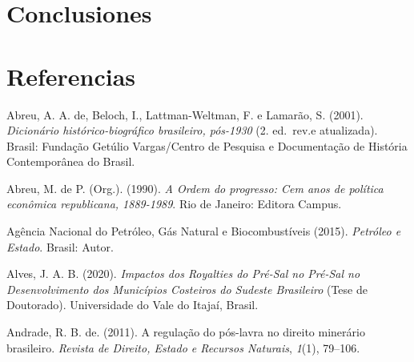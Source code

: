 \documentclass[12pt,letterpaper,oneside]{article}
\begin{document}
\section{Conclusiones}

\lipsum[1-2]

\section{Referencias}

\begin{hangparas}{6.2mm}{1}
	Abreu, A. A. de, Beloch, I., Lattman-Weltman, F. e Lamarão, S. (2001).	\emph{Dicionário histórico-biográfico brasileiro, pós-1930} (2. ed.~rev.e atualizada). Brasil: Fundação Getúlio Vargas/Centro de Pesquisa e	Documentação de História Contemporânea do Brasil.
	
	Abreu, M. de P. (Org.). (1990). \emph{A Ordem do progresso: Cem anos de	política econômica republicana, 1889-1989}. Rio de Janeiro: Editora Campus.
	
	Agência Nacional do Petróleo, Gás Natural e Biocombustíveis (2015).	\emph{Petróleo e Estado}. Brasil: Autor. 
	
	Alves, J. A. B. (2020). \emph{Impactos dos Royalties do Pré-Sal no Pré-Sal no Desenvolvimento dos Municípios Costeiros do Sudeste	Brasileiro} (Tese de Doutorado). Universidade do Vale do Itajaí, Brasil.
	
	Andrade, R. B. de. (2011). A regulação do pós-lavra no direito minerário brasileiro. \emph{Revista de Direito, Estado e Recursos Naturais},	\emph{1}(1), 79--106.
	
\end{hangparas}
\end{document}
